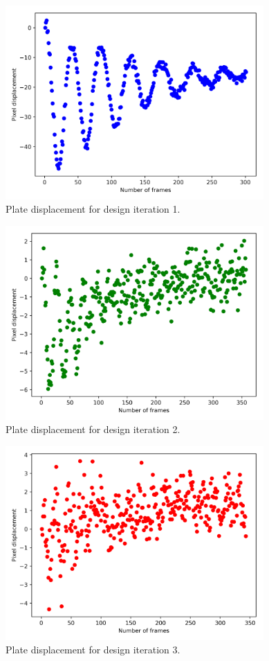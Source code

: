 \begin{figure}[H] 
	\centering
	\includegraphics[width=0.88\textwidth]{wobble_iter1.png} 
	\caption{Plate displacement for design iteration 1.}
	\label{fig:wobble_iter1}
\end{figure}

\begin{figure}[H] 
	\centering
	\includegraphics[width=0.88\textwidth]{wobble_iter2.png} 
	\caption{Plate displacement for design iteration 2.}
	\label{fig:wobble_iter2}
\end{figure}

\begin{figure}[H] 
	\centering
	\includegraphics[width=0.88\textwidth]{wobble.png} 
	\caption{Plate displacement for design iteration 3.}
	\label{fig:wobble}
\end{figure}

